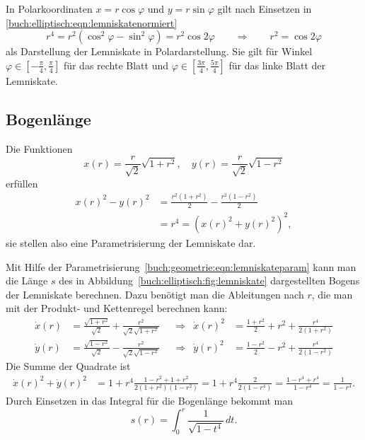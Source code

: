 In Polarkoordinaten $x=r\cos\varphi$ und $y=r\sin\varphi$
gilt nach Einsetzen in \eqref{buch:elliptisch:eqn:lemniskatenormiert}
\begin{equation}
r^4
=
r^2(\cos^2\varphi-\sin^2\varphi)
=
r^2\cos2\varphi
\qquad\Rightarrow\qquad
r^2 = \cos 2\varphi
\label{buch:elliptisch:eqn:lemniskatepolar}
\end{equation}
als Darstellung der Lemniskate in Polardarstellung.
Sie gilt für Winkel $\varphi\in[-\frac{\pi}4,\frac{\pi}4]$ für das
rechte Blatt und $\varphi\in[\frac{3\pi}4,\frac{5\pi}4]$ für das linke
Blatt der Lemniskate.

\subsection{Bogenlänge}
Die Funktionen
\begin{equation}
x(r) = \frac{r}{\sqrt{2}}\sqrt{1+r^2},
\quad
y(r) = \frac{r}{\sqrt{2}}\sqrt{1-r^2}
\label{buch:geometrie:eqn:lemniskateparam}
\end{equation}
erfüllen
\begin{align*}
x(r)^2-y(r)^2
&=
\frac{r^2(1+r^2)}{2}-\frac{r^2(1-r^2)}{2}
\\
&
=
r^4
=
(x(r)^2 + y(r)^2)^2,
\end{align*}
sie stellen also eine Parametrisierung der Lemniskate dar.

Mit Hilfe der Parametrisierung~\eqref{buch:geometrie:eqn:lemniskateparam}
kann man die Länge $s$ des in Abbildung~\ref{buch:elliptisch:fig:lemniskate}
dargestellten Bogens der Lemniskate berechnen.
Dazu benötigt man die Ableitungen nach $r$, die man mit der Produkt- und
Kettenregel berechnen kann:
\begin{align*}
\dot{x}(r)
&=
\frac{\sqrt{1+r^2}}{\sqrt{2}}
+
\frac{r^2}{\sqrt{2}\sqrt{1+r^2}}
&&\Rightarrow&
\dot{x}(r)^2
&=
\frac{1+r^2}{2} +r^2 + \frac{r^4}{2(1+r^2)}
\\
\dot{y}(r)
&=
\frac{\sqrt{1-r^2}}{\sqrt{2}}
-
\frac{r^2}{\sqrt{2}\sqrt{1-r^2}}
&&\Rightarrow&
\dot{y}(r)^2
&=
\frac{1-r^2}{2} -r^2 + \frac{r^4}{2(1-r^2)}
\end{align*}
Die Summe der Quadrate ist
\begin{align*}
\dot{x}(r)^2 + \dot{y}(r)^2
&=
1 + r^4\frac{1-r^2+1+r^2}{2(1+r^2)(1-r^2)}
=
1+r^4\frac{2}{2(1-r^4)}
=
\frac{1-r^4+r^4}{1-r^4}
=
\frac1{1-r^4}.
\end{align*}
Durch Einsetzen in das Integral für die Bogenlänge bekommt man
\begin{equation}
s(r)
=
\int_0^r
\frac{1}{\sqrt{1-t^4}}\,dt.
\label{buch:elliptisch:eqn:lemniskatebogenlaenge}
\end{equation}

